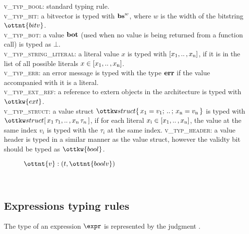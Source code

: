 \textsc{v\_typ\_bool}: standard typing rule. \\
\textsc{v\_typ\_bit}: a bitvector is typed with $\mathbf{bs}^{ w }$, where $w$ is the width of the bitstring $\ottnt{bitv}$. \\
\textsc{v\_typ\_bot}: a value $\mathbf{bot}$ (used when no value is being returned from a function call) is typed as $\bot$. \\
\textsc{v\_typ\_string\_literal}: a literal value $x$ is typed with $\left[ x_{\mathrm{1}} , .. \, , x_{\mathrm{n}} \right]$, if it is in the list of all possible literals $x \in \left[ x_{\mathrm{1}} , .. \, , x_{\mathrm{n}} \right]$. \\
\textsc{v\_typ\_err}: an error message is typed with the type $\mathbf{err}$ if the value accompanied with it is a literal. \\
\textsc{v\_typ\_ext\_ref}: a reference to extern objects in the architecture is typed with $\ottkw{ext}$. \\
\textsc{v\_typ\_struct}: a value struct $\vstruct{\structxv{x}{v}}$ is typed with $\structtyp{\structxtau{x}{\tau}}$, if for each literal $x_{\mathrm{i}} \in \left[ x_{\mathrm{1}} , .. \, , x_{\mathrm{n}} \right]$, the value at the same index $v_i$ is typed with the $\tau_i$ at the same index.
\textsc{v\_typ\_header}: a value header is typed in a similar manner as the value struct, however the validty bit should be typed as $\ottkw{bool}$. 

\vspace{1pt}
\begin{figure}[ht!]
    \begin{ottdefnblock}[#1]{$ \ottnt{v}  : (  t  ,  \ottnt{boolv}  ) $}{} \end{ottdefnblock}
    \ottusedrule{\ottdrulevXXtypXXbool{}}
    \ottusedrule{\ottdrulevXXtypXXbit{}}
    \ottusedrule{\ottdrulevXXtypXXbot{}}
    \ottusedrule{\ottdrulevXXtypXXstringXXliteral{}}
    \ottusedrule{\ottdrulevXXtypXXerr{}}
    \ottusedrule{\ottdrulevXXtypXXextXXref{}}
    \ottusedrule{\ottdrulevXXtypXXstruct{}} \\
    \ottusedrule{\ottdrulevXXtypXXheader{}}
\end{figure}



\newpage
\subsection{Expressions typing rules}
The type of an expression $\expr$ is represented by the judgment .  



